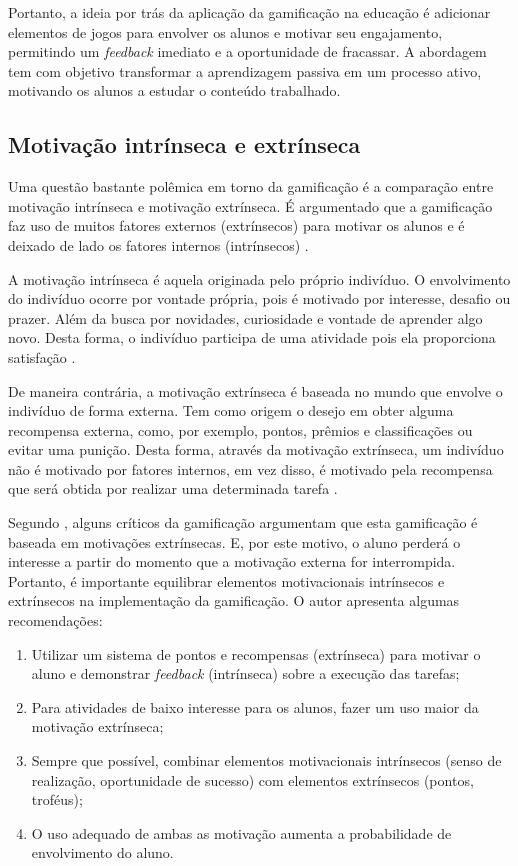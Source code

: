 \documentclass[
	12pt,				%
	oneside,			%
	a4paper,			%
	english,			%
	french,				%
	spanish,			%
	brazil,				%
	]{abntex2}
\begin{document}
Portanto, a ideia por trás da aplicação da gamificação na educação é adicionar elementos de jogos para envolver os alunos e motivar seu engajamento, permitindo um \textit{feedback} imediato e a oportunidade de fracassar. A abordagem tem com objetivo transformar a aprendizagem passiva em um processo ativo, motivando os alunos a estudar o conteúdo trabalhado.

\subsection{Motivação intrínseca e extrínseca}

Uma questão bastante polêmica em torno da gamificação é a comparação entre motivação intrínseca e motivação extrínseca. É argumentado que a gamificação faz uso de muitos fatores externos (extrínsecos) para motivar os alunos e é deixado de lado os fatores internos (intrínsecos) \cite{fardo2013gamificaccao}.

A motivação intrínseca é aquela originada pelo próprio indivíduo. O envolvimento do indivíduo ocorre por vontade própria,  pois é motivado por interesse, desafio ou prazer. Além da busca por novidades, curiosidade e vontade de aprender algo novo. Desta forma, o indivíduo participa de uma atividade pois ela proporciona satisfação \cite{busarello2016gamificaccao}.

De maneira contrária, a motivação extrínseca é baseada no mundo que envolve o indivíduo de forma externa. Tem como origem o desejo em obter alguma recompensa externa, como, por exemplo, pontos, prêmios e classificações ou evitar uma punição. Desta forma, através da motivação extrínseca, um indivíduo não é motivado por fatores internos, em vez disso, é motivado pela recompensa que será obtida por realizar uma determinada tarefa \cite{busarello2016gamificaccao}.

Segundo \citet{andre2018}, alguns críticos da gamificação argumentam que esta gamificação é baseada em motivações extrínsecas. E, por este motivo, o aluno perderá o interesse a partir do momento que a motivação externa for interrompida. Portanto, é importante equilibrar elementos motivacionais intrínsecos e extrínsecos na implementação da gamificação. O autor apresenta algumas recomendações:

\begin{enumerate}
\item Utilizar um sistema de pontos e recompensas (extrínseca) para motivar o aluno e demonstrar \textit{feedback} (intrínseca) sobre a execução das tarefas;
\item Para atividades de baixo interesse para os alunos, fazer um uso maior da motivação extrínseca;
\item Sempre que possível, combinar elementos motivacionais intrínsecos (senso de realização, oportunidade de sucesso) com elementos extrínsecos (pontos, troféus);
\item O uso adequado de ambas as motivação aumenta a probabilidade de envolvimento do aluno.
\end{enumerate}
\end{document}
